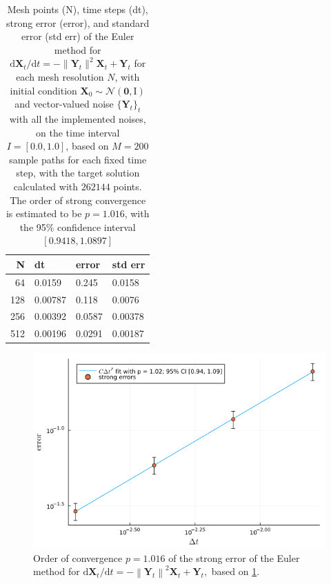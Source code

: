 \documentclass[reqno,12pt]{amsart}
\theoremstyle{plain} %
\theoremstyle{definition} %
\begin{document}
\begin{table}
    \begin{tabular}[htb]{|r|l|l|l|}
        \hline N & dt & error & std err \\
        \hline \hline
        64 & 0.0159 & 0.245 & 0.0158 \\
        128 & 0.00787 & 0.118 & 0.0076 \\
        256 & 0.00392 & 0.0587 & 0.00378 \\
        512 & 0.00196 & 0.0291 & 0.00187 \\
        \hline
    \end{tabular}
    \bigskip

    \caption{Mesh points (N), time steps (dt), strong error (error), and standard error (std err) of the Euler method for $\mathrm{d}\mathbf{X}_t/\mathrm{d}t = - \| \mathbf{Y}_t\|^2 \mathbf{X}_t + \mathbf{Y}_t$ for each mesh resolution $N$, with initial condition $\mathbf{X}_0 \sim \mathcal{N}(\mathbf{0}, \mathrm{I})$ and vector-valued noise $\{\mathbf{Y}_t\}_t$ with all the implemented noises, on the time interval $I = [0.0, 1.0]$, based on $M = 200$ sample paths for each fixed time step, with the target solution calculated with $262144$ points. The order of strong convergence is estimated to be $p = 1.016$, with the 95\% confidence interval $[0.9418, 1.0897]$}
    \label{taballnoises}
\end{table}

\begin{figure}[htb]
    \includegraphics[scale=0.6]{img/order_allnoises.png}
    \caption{Order of convergence $p = 1.016$ of the strong error of the Euler method for $\mathrm{d}\mathbf{X}_t/\mathrm{d}t = - \left\|\mathbf{Y}_t\right\|^2 \mathbf{X}_t + \mathbf{Y}_t,$ based on \cref{taballnoises}.}
    \label{figallnoises}
\end{figure}
\end{document}
